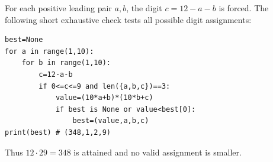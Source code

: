 For each positive leading pair $a,b$, the digit $c=12-a-b$ is forced. The following short exhaustive check tests all possible digit assignments:
\begin{verbatim}
best=None
for a in range(1,10):
    for b in range(1,10):
        c=12-a-b
        if 0<=c<=9 and len({a,b,c})==3:
            value=(10*a+b)*(10*b+c)
            if best is None or value<best[0]:
                best=(value,a,b,c)
print(best) # (348,1,2,9)
\end{verbatim}
Thus $12\cdot29=\boxed{348}$ is attained and no valid assignment is smaller.
